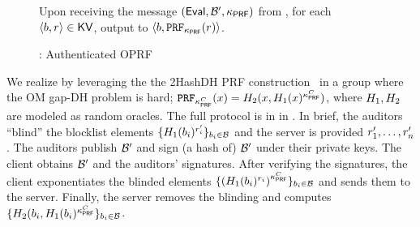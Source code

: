 \begin{figure}
\begin{mdframed}
\enumListEnd

\item Upon receiving the message $(\evaluate, \blocklist', \prfKey)$ from \client, for each $\langle \genericBlocklistElmt, \genericRand \rangle \in \kvs$, output to \server $\langle \genericBlocklistElmt, \prf{\prfKey}(\genericRand)\rangle$. 

\itemListEnd
\end{mdframed}
\caption{\authOPRFFunc: Authenticated OPRF\label{fig:authOPRF_func}}
\end{figure}

%
We realize \authOPRFFunc by leveraging the the 2HashDH PRF construction~\cite{jarecki2014round} in a group where the OM gap-DH problem is hard; $\prf{\prfKeyClient}(\genericFnInput) = \oprfRO[2](\genericFnInput, \oprfRO[1](\genericFnInput)^{\prfKeyClient})$, where $\oprfRO[1], \oprfRO[2]$ are modeled as random oracles. The full protocol is in  in . In brief, 
the auditors ``blind'' the blocklist elements $\{ \oprfRO[1](\genericBlocklistElmt[\setIdx])^{\genericRand[\setIdx]'}\}_{\genericBlocklistElmt[\setIdx] \in \blocklist}$ and the server is provided $\genericRand[1]', \dots, \genericRand[\blocklistSize]'$ . The auditors publish $\blocklist'$ and sign (a hash of) $\blocklist'$ under their private keys. The client obtains $\blocklist'$ and the auditors' signatures. After verifying the signatures, the client exponentiates the blinded elements $\{ \left(\oprfRO[1](\genericBlocklistElmt[\setIdx])^{\genericRand[\setIdx]}\right)^{\prfKeyClient}\}_{\genericBlocklistElmt[\setIdx] \in \blocklist}$ and sends them to the server. Finally, the server removes the blinding and computes $\{ \oprfRO[2](\genericBlocklistElmt[\setIdx], \oprfRO[1](\genericBlocklistElmt[\setIdx])^{\prfKeyClient}\}_{\genericBlocklistElmt[\setIdx] \in \blocklist}$. 



